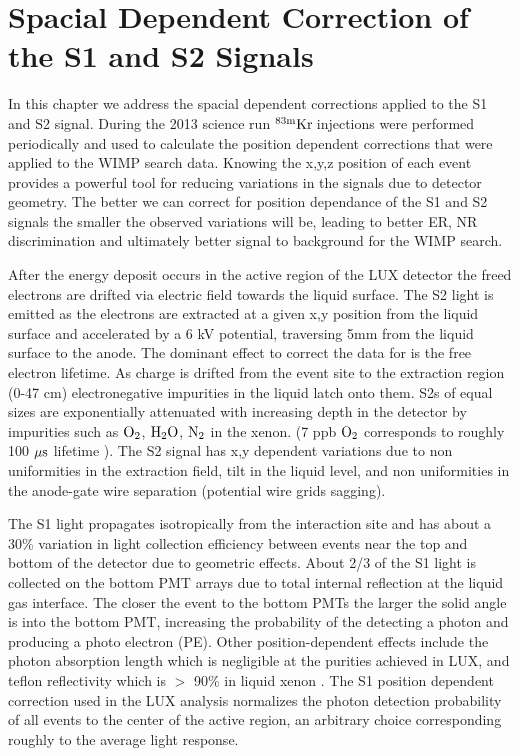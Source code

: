 
\renewcommand{\thechapter}{3}
\newcommand{\KrCal}{$\rm^{83m}Kr \: $}
\newcommand{\Rb}{$\rm^{83}Rb \: $}

\chapter{Spacial Dependent Correction of the S1 and S2 Signals}
\label{Ch:3}

In this chapter we address the spacial dependent corrections applied to the S1 and S2 signal. During the 2013 science run \KrCal injections were performed periodically and used to calculate the position dependent corrections that were applied to the WIMP search data. Knowing the x,y,z position of each event provides a powerful tool for reducing variations in the signals due to detector geometry. The better we can correct for position dependance of the S1 and S2 signals the smaller the observed variations will be, leading to better ER, NR discrimination and ultimately better signal to background for the WIMP search. 


After the energy deposit occurs in the active region of the LUX detector the freed electrons are drifted via electric field towards the liquid surface. The S2 light is emitted as the electrons are extracted at a given x,y position from the liquid surface and accelerated by a 6 kV potential, traversing 5mm from the liquid surface to the anode. The dominant effect to correct the data for is the free electron lifetime. As charge is drifted from the event site to the extraction region (0-47 cm) electronegative impurities in the liquid latch onto them. S2s of equal sizes are exponentially attenuated with increasing depth in the detector by impurities such as $\rm O_2$, $\rm H_2O$, $\rm N_2$ in the xenon. (7 ppb $\rm O_2$ corresponds to roughly 100 $\rm \mu s$ lifetime \cite{GPM}). The S2 signal has x,y dependent variations due to non uniformities in the extraction field, tilt in the liquid level, and non uniformities in the anode-gate wire separation (potential wire grids sagging). 


The S1 light propagates isotropically from the interaction site and has about a 30\% variation in light collection efficiency between events near the top and bottom of the detector due to geometric effects. About 2/3 of the S1 light is collected on the bottom PMT arrays due to total internal reflection at the liquid gas interface. The closer the event to the bottom PMTs the larger the solid angle is into the bottom PMT, increasing the probability of the detecting a photon and producing a photo electron (PE). Other position-dependent effects include the photon absorption length which is negligible at the purities achieved in LUX, and teflon reflectivity which is $>$ 90\% in liquid xenon \cite{Teflon_R_1} \cite{Teflon_R_2}. The S1 position dependent correction used in the LUX analysis normalizes the photon detection probability of all events to the center of the active region, an arbitrary choice corresponding roughly to the average light response.

